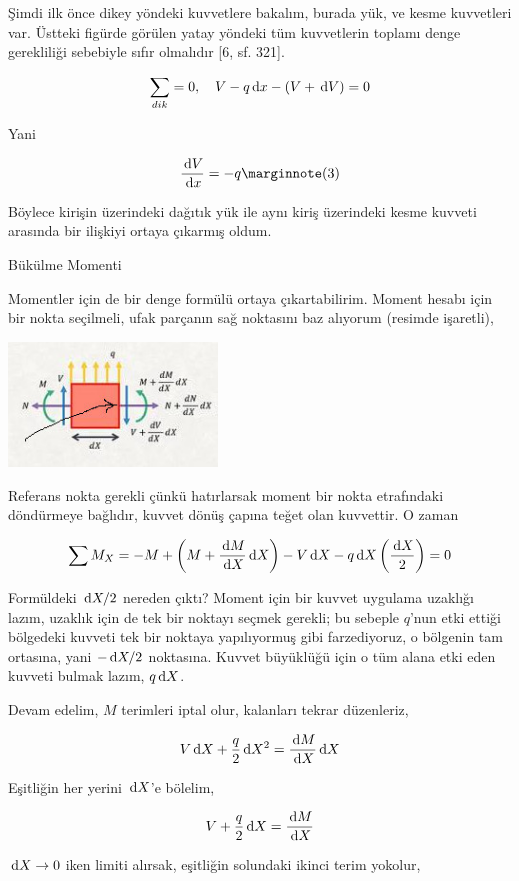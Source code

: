 \documentclass[12pt,fleqn]{article}\usepackage{../../common}
\begin{document}
Şimdi ilk önce dikey yöndeki kuvvetlere bakalım, burada yük, ve kesme
kuvvetleri var. Üstteki figürde görülen yatay yöndeki tüm kuvvetlerin toplamı
denge gerekliliği sebebiyle sıfır olmalıdır [6, sf. 321].

$$
\sum_{dik} = 0, \quad V - q \,\mathrm{d} x - (V + \,\mathrm{d} V) = 0
$$

Yani

$$
\frac{\ud V}{\ud x} = -q
\mlabel{3}
$$

Böylece kirişin üzerindeki dağıtık yük ile aynı kiriş üzerindeki kesme
kuvveti arasında bir ilişkiyi ortaya çıkarmış oldum. 

Bükülme Momenti

Momentler için de bir denge formülü ortaya çıkartabilirim. Moment hesabı için
bir nokta seçilmeli, ufak parçanın sağ noktasını baz alıyorum (resimde
işaretli),

\includegraphics[width=15em]{phy_020_strs_02_11.jpg}

Referans nokta gerekli çünkü hatırlarsak moment bir nokta etrafındaki
döndürmeye bağlıdır, kuvvet dönüş çapına teğet olan kuvvettir. O zaman 

$$
\sum M_{X} = -M + \left( M + \frac{\,\mathrm{d} M}{\,\mathrm{d} X} \,\mathrm{d} X \right) -
V \,\mathrm{d} X - q \,\mathrm{d} X \left( \frac{\,\mathrm{d} X}{2}  \right) = 0
$$

Formüldeki $\,\mathrm{d} X / 2$ nereden çıktı? Moment için bir kuvvet uygulama uzaklığı
lazım, uzaklık için de tek bir noktayı seçmek gerekli; bu sebeple $q$'nun etki
ettiği bölgedeki kuvveti tek bir noktaya yapılıyormuş gibi farzediyoruz, o
bölgenin tam ortasına, yani $- \,\mathrm{d} X / 2$ noktasına.  Kuvvet büyüklüğü için o
tüm alana etki eden kuvveti bulmak lazım, $q \,\mathrm{d} X$.

Devam edelim, $M$ terimleri iptal olur, kalanları tekrar düzenleriz,

$$
V \,\mathrm{d} X + \frac{q}{2} \,\mathrm{d} X^2 = \frac{\,\mathrm{d} M}{\,\mathrm{d} X} \,\mathrm{d} X
$$

Eşitliğin her yerini $\,\mathrm{d} X$'e bölelim,

$$
V + \frac{q}{2} \,\mathrm{d} X = \frac{\,\mathrm{d} M}{\,\mathrm{d} X} 
$$

$\,\mathrm{d} X \to 0$ iken limiti alırsak, eşitliğin solundaki ikinci terim yokolur,
\end{document}
